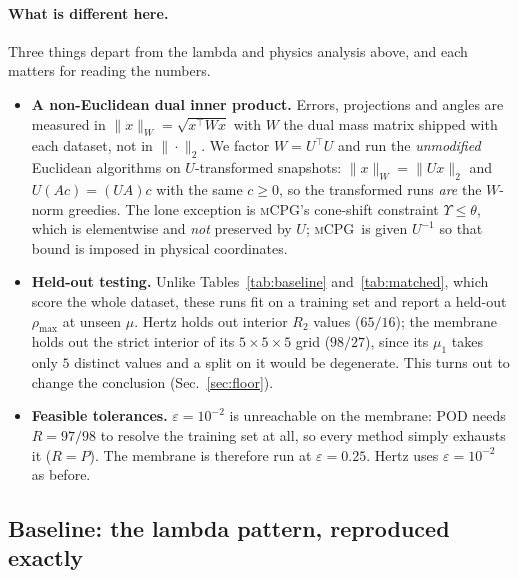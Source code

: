 \documentclass[11pt]{article}
\newcommand{\mCPG}{\textsc{mCPG}}
\begin{document}
\paragraph{What is different here.}
Three things depart from the lambda and physics analysis above, and each matters
for reading the numbers.
\begin{itemize}
  \item \textbf{A non-Euclidean dual inner product.} Errors, projections and
        angles are measured in $\|x\|_W=\sqrt{x^\top W x}$ with $W$ the dual mass
        matrix shipped with each dataset, not in $\|\cdot\|_2$. We factor
        $W=U^\top U$ and run the \emph{unmodified} Euclidean algorithms on
        $U$-transformed snapshots: $\|x\|_W=\|Ux\|_2$ and $U(Ac)=(UA)c$ with the
        same $c\ge0$, so the transformed runs \emph{are} the $W$-norm greedies.
        The lone exception is \mCPG's cone-shift constraint
        $\Upsilon\le\theta$, which is elementwise and \emph{not} preserved by
        $U$; \mCPG\ is given $U^{-1}$ so that bound is imposed in physical
        coordinates.
  \item \textbf{Held-out testing.} Unlike Tables~\ref{tab:baseline}
        and~\ref{tab:matched}, which score the whole dataset, these runs fit on a
        training set and report a held-out $\rho_{\max}$ at unseen $\mu$. Hertz
        holds out interior $R_2$ values ($65/16$); the membrane holds out the
        strict interior of its $5\times5\times5$ grid ($98/27$), since its
        $\mu_1$ takes only $5$ distinct values and a split on it would be
        degenerate. This turns out to change the conclusion (Sec.~\ref{sec:floor}).
  \item \textbf{Feasible tolerances.} $\varepsilon=10^{-2}$ is unreachable on the
        membrane: POD needs $R=97/98$ to resolve the training set at all, so
        every method simply exhausts it ($R=P$). The membrane is therefore run at
        $\varepsilon=0.25$. Hertz uses $\varepsilon=10^{-2}$ as before.
\end{itemize}

\subsection{Baseline: the lambda pattern, reproduced exactly}
\end{document}
